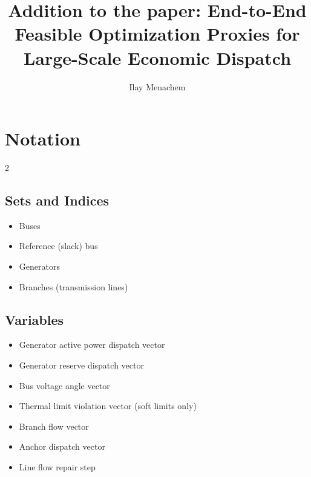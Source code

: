 \documentclass[12pt]{article}
\begin{document}
\title{Addition to the paper: End-to-End Feasible Optimization Proxies for Large-Scale Economic Dispatch}

\author{Ilay Menachem}

\date{}

\maketitle

\section*{Notation}
\begin{multicols}{2}

\subsection*{Sets and Indices}
\begin{itemize}
    \item[$i, j \in \mathcal{N}$] Buses
    \item[$\text{ref} \in \mathcal{N}$] Reference (slack) bus
    \item[$g \in \mathcal{G}$] Generators
    \item[$(i,j) \in \mathcal{E}$] Branches (transmission lines)
\end{itemize}

\subsection*{Variables}
\begin{itemize}
    \item[$\boldsymbol{p}$] Generator active power dispatch vector
    \item[$\boldsymbol{r}$] Generator reserve dispatch vector
    \item[$\theta$] Bus voltage angle vector
    \item[$\xi$] Thermal limit violation vector (soft limits only)
    \item[$f$] Branch flow vector
    \item[$\boldsymbol{p}^a$] Anchor dispatch vector
    \item[$\alpha$] Line flow repair step
\end{itemize}


\end{multicols}
\end{document}
